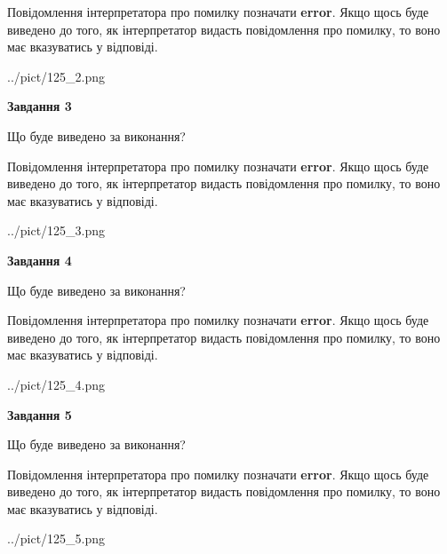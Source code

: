 \documentclass[12pt, ukrainian]{article}
\begin{document}
{\begin {large}
Повідомлення інтерпретатора про помилку позначати \textbf{error}.
Якщо щось буде виведено до того, як інтерпретатор видасть повідомлення про помилку, 
то воно має вказуватись у відповіді. \par


\begin{center}
	{../pict/125_2.png}
\end{center}
\newpage

{\begin {center}\textbf{Завдання 3}\end {center}}\par
Що буде виведено за виконання?

Повідомлення інтерпретатора про помилку позначати \textbf{error}.
Якщо щось буде виведено до того, як інтерпретатор видасть повідомлення про помилку, 
то воно має вказуватись у відповіді. \par


\begin{center}
	{../pict/125_3.png}
\end{center}
\newpage

{\begin {center}\textbf{Завдання 4}\end {center}}\par
Що буде виведено за виконання?

Повідомлення інтерпретатора про помилку позначати \textbf{error}.
Якщо щось буде виведено до того, як інтерпретатор видасть повідомлення про помилку, 
то воно має вказуватись у відповіді. \par


\begin{center}
	{../pict/125_4.png}
\end{center}
\newpage

{\begin {center}\textbf{Завдання 5}\end {center}}\par
Що буде виведено за виконання?

Повідомлення інтерпретатора про помилку позначати \textbf{error}.
Якщо щось буде виведено до того, як інтерпретатор видасть повідомлення про помилку, 
то воно має вказуватись у відповіді. \par


\begin{center}
	{../pict/125_5.png}
\end{center}
\newpage


\end{large}}
\end{document}
